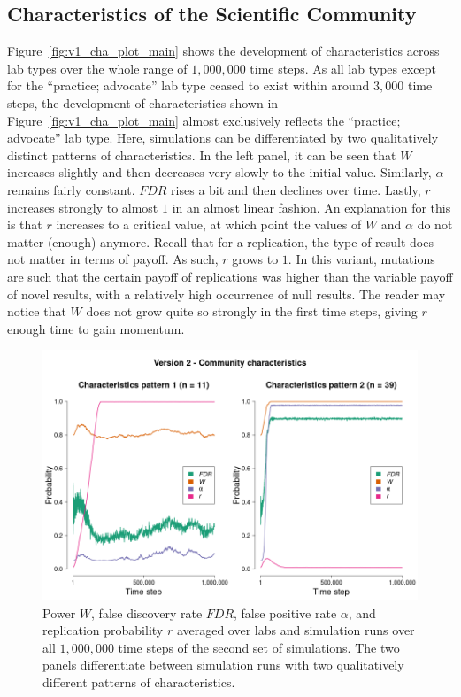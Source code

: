 \documentclass[meta, authordate,issue]{jote-new-article}
\begin{document}
\subsection{Characteristics of the Scientific Community}

Figure~\ref{fig:v1_cha_plot_main} shows the development of characteristics across lab types over the whole range of $1,000,000$ time steps. As all lab types except for the ``practice; advocate'' lab type ceased to exist within around $3,000$ time steps, the development of characteristics shown in Figure~\ref{fig:v1_cha_plot_main} almost exclusively reflects the ``practice; advocate'' lab type. Here, simulations can be differentiated by two qualitatively distinct patterns of characteristics. In the left panel, it can be seen that $W$ increases slightly and then decreases very slowly to the initial value. Similarly, $\alpha$ remains fairly constant. $FDR$ rises a bit and then declines over time. Lastly, $r$ increases strongly to almost $1$ in an almost linear fashion. An explanation for this is that $r$ increases to a critical value, at which point the values of $W$ and $\alpha$ do not matter (enough) anymore. Recall that for a replication, the type of result does not matter in terms of payoff. As such, $r$ grows to $1$. In this variant, mutations are such that the certain payoff of replications was higher than the variable payoff of novel results, with a relatively high occurrence of null results. The reader may notice that $W$ does not grow quite so strongly in the first time steps, giving $r$ enough time to gain momentum.
%
%

\begin{figure}[!t]
  \begin{fullwidth}
    \centering
    \includegraphics[width=\textwidth]{v2_cha_plot_main.png}
    \caption{Power $W$, false discovery rate $FDR$, false positive rate $\alpha$, and replication probability $r$ averaged over labs and simulation runs over all $1,000,000$ time steps of the second set of simulations. The two panels differentiate between simulation runs with two qualitatively different patterns of characteristics.}
    \label{fig:v2_cha_plot_main}
  \end{fullwidth}
\end{figure}
\end{document}
